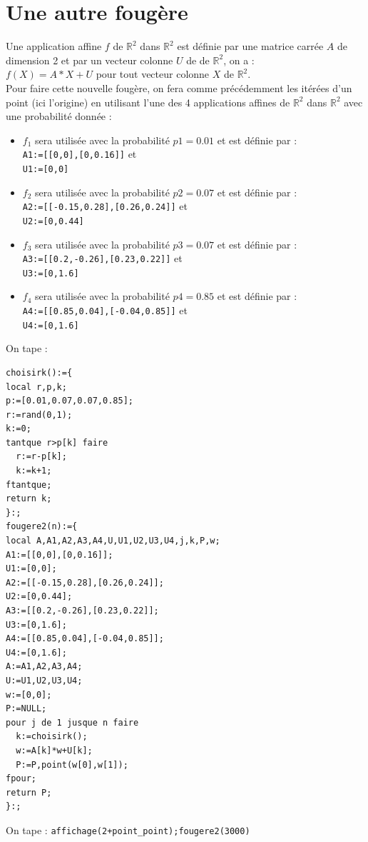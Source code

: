 \documentclass[a4paper,11pt]{book}
\newcommand{\R}{{\mathbb{R}}}
\begin{document}
\section{Une autre foug\`ere}
Une application affine $f$ de $\R^2$ dans $\R^2$ est d\'efinie par une matrice carr\'ee $A$ de dimension 2 et par un vecteur colonne $U$ de de $\R^2$, on a :\\
$f(X)=A*X+U$ pour tout vecteur colonne $X$ de $\R^2$.\\ 
Pour faire cette nouvelle foug\`ere, on fera comme pr\'ec\'edemment les 
it\'er\'ees d'un point (ici l'origine) en utilisant l'une des 4 applications 
affines de $\R^2$ dans $\R^2$ avec une probabilit\'e donn\'ee :
\begin{itemize}
\item $f_1$ sera utilis\'ee avec la probabilit\'e $p1=0.01$ et est d\'efinie 
par :\\
{\tt A1:=[[0,0],[0,0.16]]} et\\
 {\tt U1:=[0,0]}
\item $f_2$ sera utilis\'ee avec la probabilit\'e $p2=0.07$ et est d\'efinie 
par :\\
{\tt A2:=[[-0.15,0.28],[0.26,0.24]]} et\\
 {\tt U2:=[0,0.44]}
\item $f_3$ sera utilis\'ee avec la probabilit\'e $p3=0.07$ et est d\'efinie 
par :\\
{\tt A3:=[[0.2,-0.26],[0.23,0.22]]} et\\
 {\tt U3:=[0,1.6]}
\item $f_4$ sera utilis\'ee avec la probabilit\'e $p4=0.85$ et est d\'efinie 
par :\\
{\tt A4:=[[0.85,0.04],[-0.04,0.85]]} et\\
 {\tt U4:=[0,1.6]}
\end{itemize}
On tape :
\begin{verbatim}
choisirk():={
local r,p,k;
p:=[0.01,0.07,0.07,0.85];
r:=rand(0,1);
k:=0;
tantque r>p[k] faire 
  r:=r-p[k];
  k:=k+1;
ftantque;
return k;
}:;
fougere2(n):={
local A,A1,A2,A3,A4,U,U1,U2,U3,U4,j,k,P,w;
A1:=[[0,0],[0,0.16]];
U1:=[0,0];
A2:=[[-0.15,0.28],[0.26,0.24]];
U2:=[0,0.44];
A3:=[[0.2,-0.26],[0.23,0.22]];
U3:=[0,1.6];
A4:=[[0.85,0.04],[-0.04,0.85]];
U4:=[0,1.6];
A:=A1,A2,A3,A4;
U:=U1,U2,U3,U4;
w:=[0,0];
P:=NULL;
pour j de 1 jusque n faire
  k:=choisirk();
  w:=A[k]*w+U[k];
  P:=P,point(w[0],w[1]);
fpour;
return P;
}:;
\end{verbatim}
On tape :
{\tt affichage(2+point\_point);fougere2(3000)}\\
\end{document}
